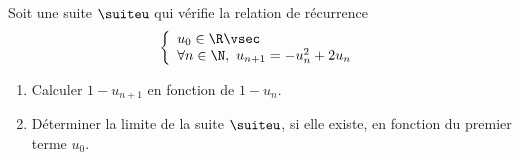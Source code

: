 
\begin{exercice} \;
Soit une suite $\suiteu$ qui v\'erifie la relation de r\'ecurrence
$$\left\lbrace\begin{array}{l}
u_0\in\R\vsec\\
\forall n\in\N,\ u_{n+1}=-u_n^2+2u_n
\end{array}\right.$$
\begin{enumerate}
 \item 
Calculer $1-u_{n+1}$ en fonction de $1-u_n$.
\item 
D\'eterminer la limite de la suite $\suiteu$, si elle existe, en fonction du premier terme $u_0$.
\end{enumerate}
\end{exercice}